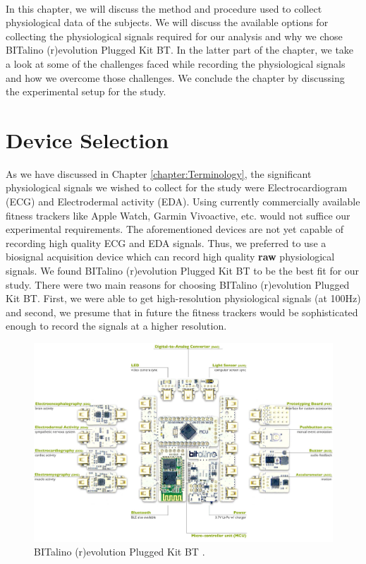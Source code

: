 \label{chapter:data_collection}
\paragraph{}
In this chapter, we will discuss the method and procedure used to collect physiological data of the subjects. We will discuss the available options for collecting the physiological signals required for our analysis and why we chose BITalino (r)evolution Plugged Kit BT. In the latter part of the chapter, we take a look at some of the challenges faced while recording the physiological signals and how we overcome those challenges. We conclude the chapter by discussing the experimental setup for the study.
\section{Device Selection}
As we have discussed in Chapter \ref{chapter:Terminology}, the significant physiological signals we wished to collect for the study were Electrocardiogram (ECG) and Electrodermal activity (EDA). Using currently commercially available fitness trackers like Apple Watch, Garmin Vivoactive, etc. would not suffice our experimental requirements. The aforementioned devices are not yet capable of recording high quality ECG and EDA signals. Thus, we preferred to use a biosignal acquisition device which can record high quality \textbf{raw} physiological signals. We found BITalino (r)evolution Plugged Kit BT to be the best fit for our study. There were two main reasons for choosing BITalino (r)evolution Plugged Kit BT. First, we were able to get high-resolution physiological signals (at 100Hz) and second, we presume that in future the fitness trackers would be sophisticated enough to record the signals at a higher resolution.
\begin{figure}
\centering
\includegraphics[width=140mm]{Figures/bitalino.jpg}
\caption{BITalino (r)evolution Plugged Kit BT \cite{bitalino_datasheet}.}
\label{fig:bitalino}
\end{figure}
